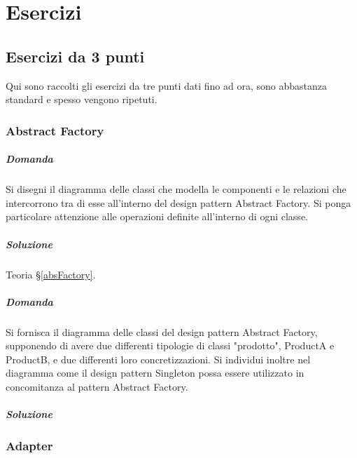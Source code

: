 \chapter{Esercizi}

\section{Esercizi da 3 punti}
Qui sono raccolti gli esercizi da tre punti dati fino ad ora, sono abbastanza standard e spesso vengono ripetuti.

\subsection{Abstract Factory}

\paragraph{Domanda}

Si disegni il diagramma delle classi che modella le componenti e le relazioni che intercorrono tra di esse all'interno del design pattern Abstract Factory. Si ponga particolare attenzione alle operazioni definite all'interno di ogni classe.

\paragraph{Soluzione} Teoria §\ref{absFactory}.

\paragraph{Domanda}

Si fornisca il diagramma delle classi del design pattern Abstract Factory, supponendo di avere due differenti tipologie di classi "prodotto", ProductA e ProductB, e due differenti loro concretizzazioni. Si individui inoltre nel diagramma come il design pattern Singleton possa essere utilizzato in concomitanza al pattern Abstract Factory.

\paragraph{Soluzione}


\subsection{Adapter}


